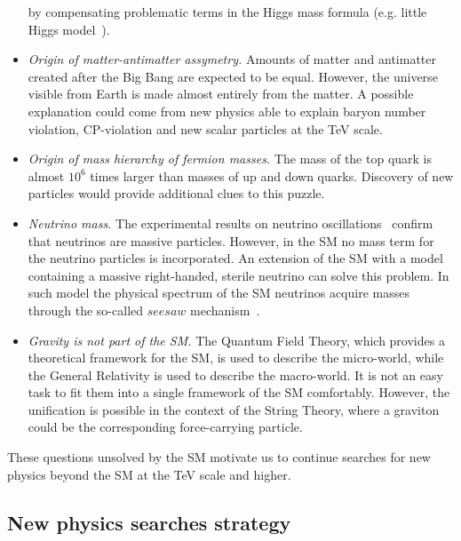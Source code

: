 \begin{itemize}
by compensating problematic terms in the Higgs mass formula (e.g. little Higgs model~\cite{Brak}).
\item \textit{Origin of matter-antimatter assymetry.} Amounts of matter and antimatter created after the Big Bang are expected to be equal. However, the universe visible from Earth is made almost entirely from the matter.
A possible explanation could come from new physics able to explain baryon number violation, CP-violation and new scalar particles at the TeV scale.
\item \textit{Origin of mass hierarchy of fermion masses.} The mass of the top quark is almost $10^6$ times larger than masses of up and down quarks. Discovery of new particles would provide additional clues to this puzzle.
\item \textit{Neutrino mass.} The experimental results on neutrino oscillations~\cite{Fukuda:1998fd} confirm that neutrinos are massive particles. However, in the SM no mass term for the neutrino particles is incorporated. An extension of the SM with a model containing a massive right-handed, sterile neutrino can solve this problem. In such model the physical spectrum of the SM neutrinos acquire masses through the so-called $seesaw$ mechanism~\cite{Mohapatra:1979ia}.
\item \textit{Gravity is not part of the SM.} The Quantum Field Theory, which provides a theoretical framework for the SM, is used to describe the micro-world, while the General Relativity is used to describe the macro-world. It is not an easy task to fit them into a single framework of the SM comfortably. However, the unification is possible in the context of the String Theory, where a graviton could be the corresponding force-carrying particle.
\end{itemize}

These questions unsolved by the SM motivate us to continue searches for new physics beyond the SM at the TeV scale and higher.

\subsection{New physics searches strategy}


